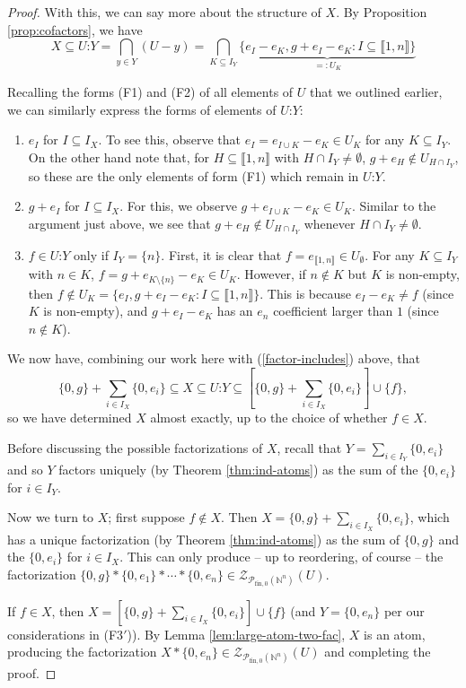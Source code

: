 \documentclass{report}
\newcommand{\NN}{\mathbb{N}}
\renewcommand{\P}{\mathcal{P}}
\newcommand{\Z}{\mathcal{Z}}
\newcommand{\llb}{\llbracket}
\newcommand{\rrb}{\rrbracket}
\newcommand{\fon}{{\textrm{fin}, 0}}
\renewcommand{\:}{\text{:}}
\theoremstyle{definition}
\begin{document}
\begin{proof}
With this, we can say more about the structure of $X$.
By Proposition \ref{prop:cofactors}, we have 
\[X \subseteq U\:Y = \bigcap_{y\in Y}(U-y) = \bigcap_{K\subseteq I_Y} \underbrace{\{e_I - e_K, g+e_I - e_K : I\subseteq \llb 1,n \rrb \}}_{=:U_K} \]

Recalling the forms (F1) and (F2) of all elements of $U$ that we outlined earlier, we can similarly express the forms of elements of $U\:Y$:
\begin{enumerate}[label={\rm (F\arabic{*}$'$)}]
\item $e_I$ for $I\subseteq I_X$. 
To see this, observe that $e_I = e_{I\cup K}-e_K\in U_K$ for any $K\subseteq I_Y$.
On the other hand note that, for $H \subseteq \llb 1,n \rrb$ with $H\cap I_Y\neq \emptyset$, $g+e_H\notin U_{H\cap I_Y}$, so these are the only elements of form (F1) which remain in $U\:Y$.
%
\item $g+e_I$ for $I\subseteq I_X$.
For this, we observe $g+e_{I\cup K} - e_K\in U_K$. 
Similar to the argument just above, we see that $g+e_H\notin U_{H\cap I_Y}$ whenever $H\cap I_Y\neq\emptyset$.
\item $f\in U\:Y$ only if $I_Y = \{n\}$.
First, it is clear that $f = e_{\llb 1,n \rrb} \in U_\emptyset$.
For any $K\subseteq I_Y$ with $n\in K$, $f = g+ e_{K\setminus\{n\}} - e_K\in U_K$.
However, if $n\notin K$ but $K$ is non-empty, then $f\notin U_K = \{e_I, g+e_I-e_K: I\subseteq \llb1,n\rrb\}$.
This is because $e_I - e_K \neq f$ (since $K$ is non-empty), and $g+e_I-e_K$ has an $e_n$ coefficient larger than $1$ (since $n\notin K$).
\end{enumerate}
We now have, combining our work here with (\ref{factor-includes}) above, that
\[ \{0,g\} + \sum_{i\in I_X}\{0,e_i\} \subseteq X \subseteq U\:Y \subseteq \left[\{0,g\}+\sum_{i\in I_X} \{0,e_i\} \right]\cup\{f\},\]
so we have determined $X$ almost exactly, up to the choice of whether $f\in X$.

Before discussing the possible factorizations of $X$, recall that $Y = \sum_{i\in I_Y} \{0,e_i\}$ and so $Y$ factors uniquely (by Theorem \ref{thm:ind-atoms}) as the sum of the $\{0,e_i\}$ for $i\in I_Y$.

Now we turn to $X$; first suppose $f\notin X$.
Then $X = \{0,g\} +\sum_{i\in I_X} \{0,e_i\}$, which has a unique factorization (by Theorem \ref{thm:ind-atoms}) as the sum of $\{0,g\}$ and the $\{0,e_i\}$ for $i\in I_X$.
This can only produce -- up to reordering, of course -- the factorization $\{0,g\}*\{0,e_1\}*\cdots*\{0,e_n\}\in \Z_{\P_\fon(\NN^n)}(U)$.

If $f\in X$, then $X = \left[\{0,g\}+\sum_{i\in I_X} \{0,e_i\} \right]\cup\{f\}$ (and $Y = \{0,e_n\}$ per our considerations in (F3$'$)).
By Lemma \ref{lem:large-atom-two-fac}, $X$ is an atom, producing the factorization $X*\{0,e_n\}\in \Z_{\P_\fon(\NN^n)}(U)$ and completing the proof.
\end{proof}
\end{document}
